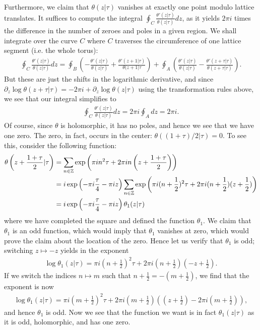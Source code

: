 \documentclass{../mathnotes}
\begin{document}
Furthermore, we claim that $\theta(z|\tau)$ vanishes at exactly one point modulo lattice translates. It suffices to compute
the integral $\oint_C\frac{\theta'(z|\tau)}{\theta(z|\tau)}dz$, as it yields $2\pi i$ times the difference in the number of zeroes and poles in
a given region. We shall integrate over the curve $C$ where $C$ traverses the circumference of one lattice segment (i.e. the whole torus):
\begin{align*}
    \oint_C \frac{\theta'(z|\tau)}{\theta(z|\tau)}dz=\oint_B\left(-\frac{\theta'(z|\tau)}{\theta(z|\tau)}+\frac{\theta'(z+1|\tau)}{\theta(z+1|\tau}\right)
    +\oint_A\left(\frac{\theta'(z|\tau)}{\theta(z|\tau)}-\frac{\theta'(z+\tau|\tau)}{\theta(z+\tau|\tau)}\right).
\end{align*}
But these are just the shifts in the logarithmic derivative, and since $\partial_z\log\theta(z+\tau|\tau)=-2\pi i+\partial_z\log\theta(z|\tau)$ using
the transformation rules above, we see that our integral simplifies to
\begin{align*}
    \oint_C \frac{\theta'(z|\tau)}{\theta(z|\tau)}dz=2\pi i\oint_A dz=2\pi i.
\end{align*}
Of course, since $\theta$ is holomorphic, it has no poles, and hence we see that we have one zero. The zero, in fact, occurs in the center:
$\theta\left( (1+\tau)/2|\tau \right)=0$. To see this, consider the following function:
\begin{align*}
    \theta\left( z+\frac{1+\tau}{2}|\tau \right)&=\sum_{n\in\mathbb{Z}}\exp\left( \pi i n^2\tau+2\pi i n\left(z+\frac{1+\tau}{2}\right) \right)\\
    &=i\exp\left( -\pi i\frac{\tau}{4}-\pi iz \right)\sum_{n\in\mathbb{Z}}\exp\left( \pi i(n+\frac{1}{2})^2\tau+2\pi i(n+\frac{1}{2})(z+\frac{1}{2}) \right)\\
    &=i\exp\left( -\pi i\frac{\tau}{4}-\pi iz \right)\theta_1(z|\tau)
\end{align*}
where we have completed the square and defined the function $\theta_1$. We claim that $\theta_1$ is an odd function, which would imply that $\theta_1$ vanishes
at zero, which would prove the claim about the location of the zero. Hence let us verify that $\theta_1$ is odd; switching $z\mapsto-z$ yields in the exponent
\begin{align*}
    \log\theta_1(z|\tau)=\pi i\left( n+\frac{1}{2} \right)^2\tau+2\pi i\left( n+\frac{1}{2} \right)\left( -z+\frac{1}{2} \right).
\end{align*}
If we switch the indices $n\mapsto m$ such that $n+\frac{1}{2}=-\left( m+\frac{1}{2} \right)$, we find that the exponent is now
\begin{align*}
    \log\theta_1(z|\tau)=\pi i\left( m+\frac{1}{2} \right)^2\tau+2\pi i\left( m+\frac{1}{2} \right)\left(\left( z+\frac{1}{2} \right)-2\pi i\left( m+\frac{1}{2} \right)\right),
\end{align*}
and hence $\theta_1$ is odd. Now we see that the function we want is in fact $\theta_1(z|\tau)$ as it is odd, holomorphic, and has one zero.
\end{document}

